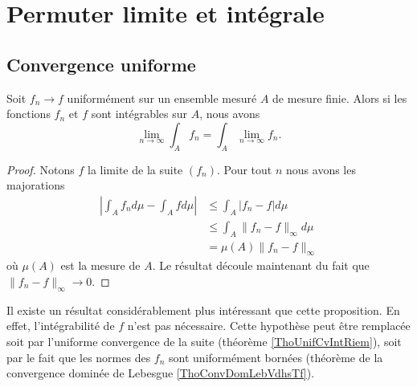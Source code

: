 \section{Permuter limite et intégrale}

\subsection{Convergence uniforme}

\begin{proposition}       \label{PropbhKnth}
    Soit \( f_n\to f\) uniformément sur un ensemble mesuré \( A\) de mesure finie. Alors si les fonctions \( f_n\) et \( f\) sont intégrables sur \( A\), nous avons
    \begin{equation}
        \lim_{n\to \infty} \int_A f_n=\int_A \lim_{n\to \infty} f_n.
    \end{equation}
\end{proposition}

\begin{proof}
    Notons \( f\) la limite de la suite \( (f_n)\). Pour tout \( n\) nous avons les majorations
    \begin{subequations}
        \begin{align}
            \left| \int_A f_n d\mu-\int_A fd\mu \right| &\leq \int_A| f_n-f |d\mu\\
            &\leq \int_A \| f_n-f \|_{\infty}d\mu\\
            &=\mu(A)\| f_n-f \|_{\infty}
        \end{align}
    \end{subequations}
    où \( \mu(A)\) est la mesure de \( A\). Le résultat découle maintenant du fait que \( \| f_n-f \|_{\infty}\to 0\).
\end{proof}
Il existe un résultat considérablement plus intéressant que cette proposition. En effet, l'intégrabilité de \( f\) n'est pas nécessaire. Cette hypothèse peut être remplacée soit par l'uniforme convergence de la suite (théorème \ref{ThoUnifCvIntRiem}), soit par le fait que les normes des \( f_n\) sont uniformément bornées (théorème de la convergence dominée de Lebesgue \ref{ThoConvDomLebVdhsTf}).


